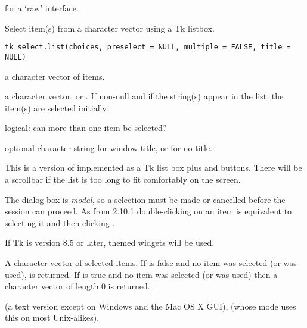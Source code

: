 %
\begin{SeeAlso}\relax
{} for a `raw' interface.
\end{SeeAlso}
%
\begin{Description}\relax
Select item(s) from a character vector using a Tk listbox.
\end{Description}
%
\begin{Usage}
\begin{verbatim}
tk_select.list(choices, preselect = NULL, multiple = FALSE, title = NULL)
\end{verbatim}
\end{Usage}
%
\begin{Arguments}
\begin{ldescription}
\item[\code{choices}] a character vector of items.
\item[\code{preselect}] a character vector, or .  If non-null and
if the string(s) appear in the list, the item(s) are selected
initially.
\item[\code{multiple}] logical: can more than one item be selected?
\item[\code{title}] optional character string for window title, or
 for no title.
\end{ldescription}
\end{Arguments}
%
\begin{Details}\relax
This is a version of  implemented as a Tk
list box plus  and  buttons.  There will be a
scrollbar if the list is too long to fit comfortably on the screen.

The dialog box is \emph{modal}, so a selection must be made or
cancelled before the \R{} session can proceed.  As from \R{} 2.10.1
double-clicking on an item is equivalent to selecting it and then
clicking .

If Tk is version 8.5 or later, themed widgets will be used.
\end{Details}
%
\begin{Value}
A character vector of selected items.  If  is false and
no item was selected (or  was used),  is
returned.   If  is true and no item was selected (or
 was used) then a character vector of length 0 is returned.
\end{Value}
%
\begin{SeeAlso}\relax
{} (a text version except on Windows and the
Mac OS X GUI),
 (whose  mode uses this
on most Unix-alikes).
\end{SeeAlso}
\clearpage
